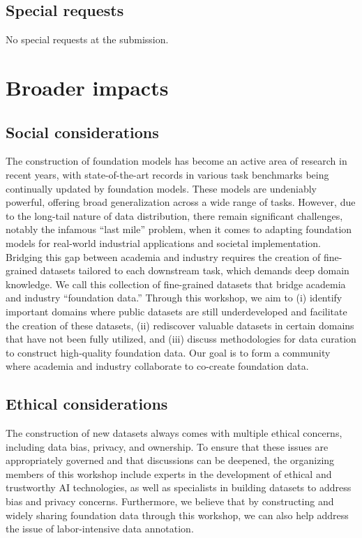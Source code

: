 \documentclass{article}
\newcommand{\cYoshi}[1]{{\color{cyan}{#1}}} %
\def\c#1{\textcolor{gray}{#1}}
\begin{document}
\subsection{Special requests}
No special requests at the submission.


\section{Broader impacts}

\subsection{Social considerations}
The construction of foundation models has become an active area of research in recent years, with state-of-the-art records in various task benchmarks being continually updated by foundation models. These models are undeniably powerful, offering broad generalization across a wide range of tasks. However, due to the long-tail nature of data distribution, there remain significant challenges, notably the infamous ``last mile'' problem, when it comes to adapting foundation models for real-world industrial applications and societal implementation. Bridging this gap between academia and industry requires the creation of fine-grained datasets tailored to each downstream task, which demands deep domain knowledge. We call this collection of fine-grained datasets that bridge academia and industry ``foundation data.'' Through this workshop, we aim to (i) identify important domains where public datasets are still underdeveloped and facilitate the creation of these datasets, (ii) rediscover valuable datasets in certain domains that have not been fully utilized, and (iii) discuss methodologies for data curation to construct high-quality foundation data. Our goal is to form a community where academia and industry collaborate to co-create foundation data.


\subsection{Ethical considerations}

The construction of new datasets always comes with multiple ethical concerns, including data bias, privacy, and ownership. To ensure that these issues are appropriately governed and that discussions can be deepened, the organizing members of this workshop include experts in the development of ethical and trustworthy AI technologies, as well as specialists in building datasets to address bias and privacy concerns. Furthermore, we believe that by constructing and widely sharing foundation data through this workshop, we can also help address the issue of labor-intensive data annotation.
\end{document}
